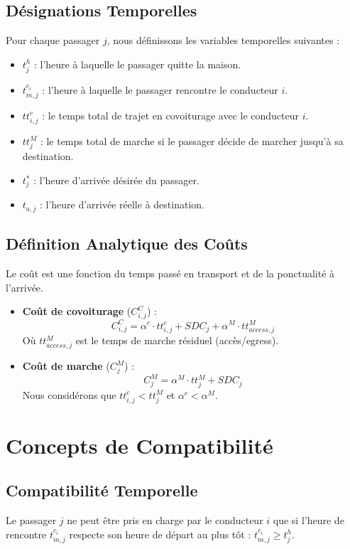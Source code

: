 \documentclass[11pt,a4paper]{article}
\begin{document}
\subsection{Désignations Temporelles}
Pour chaque passager $j$, nous définissons les variables temporelles suivantes :
\begin{itemize}
    \item $t^h_j$ : l'heure à laquelle le passager quitte la maison.
    \item $t^{c_i}_{m,j}$ : l'heure à laquelle le passager rencontre le conducteur $i$.
    \item $tt^c_{i,j}$ : le temps total de trajet en covoiturage avec le conducteur $i$.
    \item $tt^M_j$ : le temps total de marche si le passager décide de marcher jusqu'à sa destination.
    \item $t^*_j$ : l'heure d'arrivée désirée du passager.
    \item $t_{a,j}$ : l'heure d'arrivée réelle à destination.
\end{itemize}

\subsection{Définition Analytique des Coûts}
Le coût est une fonction du temps passé en transport et de la ponctualité à l'arrivée.
\begin{itemize}
    \item \textbf{Coût de covoiturage} ($C^C_{i,j}$) :
    \begin{equation}
        C^C_{i,j} = \alpha^c \cdot tt^c_{i,j} + SDC_j + \alpha^M \cdot tt^M_{access,j}
    \end{equation}
    Où $tt^M_{access,j}$ est le temps de marche résiduel (accès/egress).
    \item \textbf{Coût de marche} ($C^M_j$) :
    \begin{equation}
        C^M_j = \alpha^M \cdot tt^M_j + SDC_j
    \end{equation}
    Nous considérons que $tt^c_{i,j} < tt^{M}_j$ et $\alpha^c < \alpha^M$.
\end{itemize}

\section{Concepts de Compatibilité}

\subsection{Compatibilité Temporelle}
Le passager $j$ ne peut être pris en charge par le conducteur $i$ que si l'heure de rencontre $t^{c_i}_{m,j}$ respecte son heure de départ au plus tôt : $t^{c_i}_{m,j} \ge t^h_j$.
\end{document}
